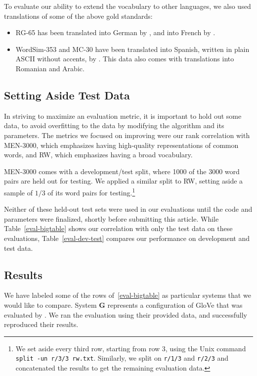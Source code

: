 \documentclass[letterpaper]{article}
\begin{document}
To evaluate our ability to extend the vocabulary to other languages, we also
used translations of some of the above gold standards:

\begin{itemize}
\item RG-65 has been translated into German by ,
    and into French by .
\item WordSim-353 and MC-30 have been translated into Spanish, written in
    plain ASCII without accents, by . This
    data also comes with translations into Romanian and Arabic.
\end{itemize}

\subsection{Setting Aside Test Data}

In striving to maximize an evaluation metric, it is important to hold out some
data, to avoid overfitting to the data by modifying the algorithm and its
parameters. The metrics we focused on improving were our rank correlation with
MEN-3000, which emphasizes having high-quality representations of common words,
and RW, which emphasizes having a broad vocabulary.

MEN-3000 comes with a development/test split, where 1000 of the 3000 word pairs
are held out for testing. We applied a similar split to RW, setting aside a
sample of $1/3$ of its word pairs for testing.\footnote{
    We set aside every third row, starting from row 3, using the Unix command
    {\tt split -un r/3/3 rw.txt}. Similarly, we split on {\tt r/1/3} and
    {\tt r/2/3} and concatenated the results to get the remaining evaluation
    data.
}

Neither of these held-out test sets were used in our evaluations until the code
and parameters were finalized, shortly before submitting this article. While
Table~\ref{eval-bigtable} shows our correlation with only the test data on these
evaluations, Table~\ref{eval-dev-test} compares our performance on development
and test data.

\subsection{Results}

We have labeled some of the rows of~\ref{eval-bigtable} as particular systems
that we would like to compare. System {\bf G} represents a configuration of
GloVe that was evaluated by . We ran the evaluation
using their provided data, and successfully reproduced their results.
\end{document}
